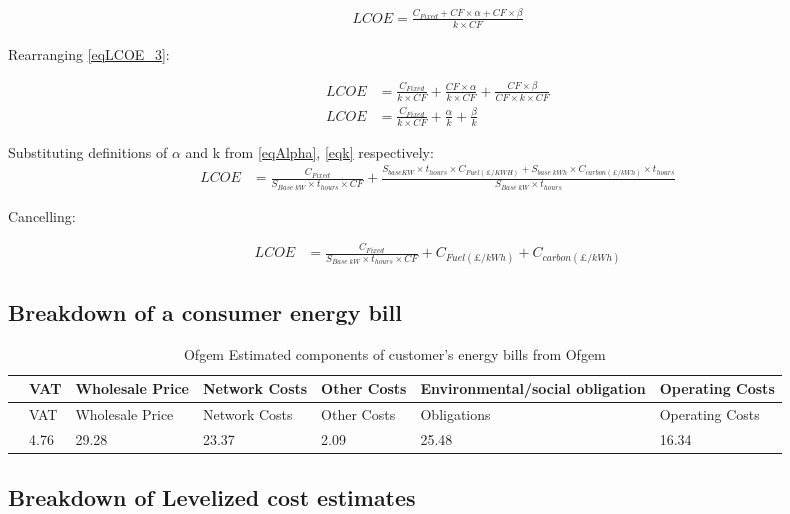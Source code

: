 \documentclass[11pt]{article}
\numberwithin{equation}{section}
\begin{document}
\begin{align}
\label{eqLCOE_3}
LCOE = \frac{C_{Fixed} +CF\times \alpha +CF\times \beta}{k\times CF}
\end{align}

Rearranging \ref{eqLCOE_3}:

\begin{align}
\label{eqLCOE_3}
LCOE &= \frac{C_{Fixed}}{k\times CF}+\frac{CF\times \alpha}{k\times CF}+ \frac{CF\times \beta}{CF \times k\times CF}  \\
LCOE &= \frac{C_{Fixed}}{k\times CF}+\frac{\alpha}{k} + \frac{\beta}{k}
\end{align}

Substituting definitions of \(\alpha\) and k from \ref{eqAlpha}, \ref{eqk} respectively:
\begin{align}
\label{eqLCOE_4}
LCOE &= \frac{C_{Fixed}}{S_{Base\; kW} \times t_{hours}\times CF}+\frac{S_{base KW}\times t_{hours} \times C_{Fuel(\pounds/KWH)}+ S_{base\;kWh} \times C_{carbon (\pounds/kWh)} \times t_{hours}
}{S_{Base\; kW} \times t_{hours}}
\end{align}

Cancelling:

\begin{align}
\label{eqLCOE_5}
LCOE &= \frac{C_{Fixed}}{S_{Base\; kW} \times t_{hours}\times CF}+ C_{Fuel(\pounds/kWh)} + C_{carbon(\pounds/kWh)}
\end{align}

\subsection{Breakdown of a consumer energy bill}
\label{sec:org0354a3d}

\begin{table}[H]
\caption{\label{tabBillBreakdown}Ofgem Estimated components of customer's energy bills from Ofgem \cite{ofgemBillBreakdown}}
\centering
\footnotesize
\begin{tabular}{lllllll}
\toprule
 & VAT & Wholesale Price & Network Costs & Other Costs & Environmental/social obligation & Operating Costs\\
\midrule
 & VAT & Wholesale Price & Network Costs & Other Costs & Obligations & Operating Costs\\
 & 4.76 & 29.28 & 23.37 & 2.09 & 25.48 & 16.34\\
\bottomrule
\end{tabular}
\end{table}
\subsection{Breakdown of Levelized cost estimates}
\label{sec:orgad553c5}
\end{document}
